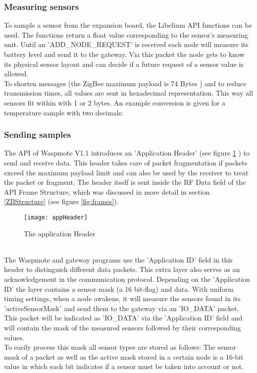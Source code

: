 \subsubsection{Measuring sensors}
To sample a sensor from the expansion board, the Libelium API functions can be used. The functions return a float value corresponding to the sensor's measuring unit. Until an 'ADD\_NODE\_REQUEST' is received each node will measure its battery level and send it to the gateway. Via this packet the node gets to know its physical sensor layout and can decide if a future request of a sensor value is allowed.\\
To shorten messages (the ZigBee maximum payload is 74 Bytes  ) and to reduce transmission times, all values are sent in hexadecimal representation. This way all sensors fit within with 1 or 2 bytes. An example conversion is given for a temperature sample with two decimals:

\subsubsection{Sending samples}
\label{frames1}
The API of Waspmote V1.1 introduces an 'Application Header' (see figure \ref{fig:appH} ) to send and receive data. This header takes care of packet fragmentation if packets exceed the maximum payload limit and can also be used by the receiver to treat the packet or fragment. The header itself is sent inside the RF Data field of the API Frame Structure, which was discussed in more detail in section \ref{ZBStructure} (see figure \ref{fig:frames}).
\begin{figure}[ht]
\centering
\texttt{[image: appHeader]}
\caption{The application Header}
\label{fig:appH}
\end{figure}\\
\noindent
The Waspmote and gateway programs use the 'Application ID' field in this header to distinguish different data packets. This extra layer also serves as an acknowledgement in the communication protocol. Depending on the 'Application ID' the layer contains a sensor mask (a 16 bit-flag) and data. With uniform timing settings, when a node awakens, it will measure the sensors found in its 'activeSensorMask' and send them to the gateway via an 'IO\_DATA' packet. This packet will be indicated as 'IO\_DATA' via the 'Application ID' field and will contain the mask of the measured sensors followed by their corresponding values.\\
To easily process this mask all sensor types are stored as follows:
The sensor mask of a packet as well as the active mask stored in a certain node is a 16-bit value in which each bit indicates if a sensor must be taken into account or not.

